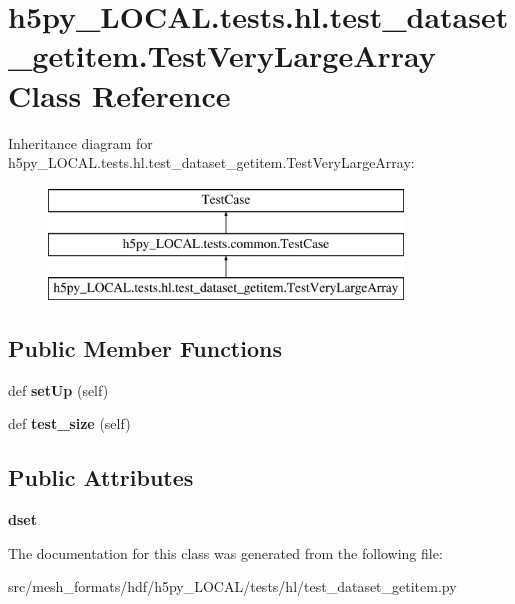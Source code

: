 \hypertarget{classh5py__LOCAL_1_1tests_1_1hl_1_1test__dataset__getitem_1_1TestVeryLargeArray}{}\section{h5py\+\_\+\+L\+O\+C\+A\+L.\+tests.\+hl.\+test\+\_\+dataset\+\_\+getitem.\+Test\+Very\+Large\+Array Class Reference}
\label{classh5py__LOCAL_1_1tests_1_1hl_1_1test__dataset__getitem_1_1TestVeryLargeArray}
Inheritance diagram for h5py\+\_\+\+L\+O\+C\+A\+L.\+tests.\+hl.\+test\+\_\+dataset\+\_\+getitem.\+Test\+Very\+Large\+Array\+:\begin{figure}[H]
\begin{center}
\leavevmode
\includegraphics[height=3.000000cm]{classh5py__LOCAL_1_1tests_1_1hl_1_1test__dataset__getitem_1_1TestVeryLargeArray}
\end{center}
\end{figure}
\subsection*{Public Member Functions}
\begin{DoxyCompactItemize}
\item 
\mbox{\label{classh5py__LOCAL_1_1tests_1_1hl_1_1test__dataset__getitem_1_1TestVeryLargeArray_a02c5c7ee703208d593a0376c86f792c8}} 
def {\bfseries set\+Up} (self)
\item 
\mbox{\label{classh5py__LOCAL_1_1tests_1_1hl_1_1test__dataset__getitem_1_1TestVeryLargeArray_a6e6ed884074c25a7d2a7463cf1fc103f}} 
def {\bfseries test\+\_\+size} (self)
\end{DoxyCompactItemize}
\subsection*{Public Attributes}
\begin{DoxyCompactItemize}
\item 
\mbox{\label{classh5py__LOCAL_1_1tests_1_1hl_1_1test__dataset__getitem_1_1TestVeryLargeArray_a8affe83d01efe81e418699a03b50aef4}} 
{\bfseries dset}
\end{DoxyCompactItemize}


The documentation for this class was generated from the following file\+:\begin{DoxyCompactItemize}
\item 
src/mesh\+\_\+formats/hdf/h5py\+\_\+\+L\+O\+C\+A\+L/tests/hl/test\+\_\+dataset\+\_\+getitem.\+py\end{DoxyCompactItemize}
